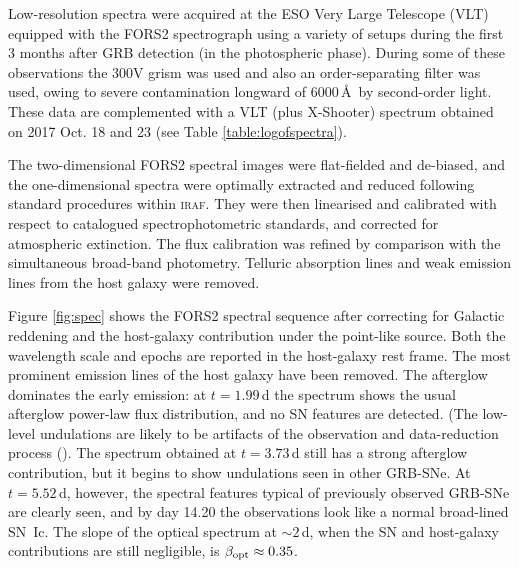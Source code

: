 \documentclass[fleqn,usenatbib]{mnras}
\begin{document}
Low-resolution spectra were acquired at the ESO Very Large Telescope (VLT) equipped with the FORS2 spectrograph using a variety of setups during the first 3 months after GRB detection (in the photospheric phase). During some of these observations the 300V grism was used and  also an order-separating filter was used, owing to severe contamination longward of 6000\,\AA\  by second-order light. These data are complemented with a VLT (plus X-Shooter) spectrum obtained on 2017 Oct. 18 and 23 (see Table \ref{table:logofspectra}). 


The two-dimensional FORS2 spectral images  were flat-fielded and de-biased, and the one-dimensional spectra were optimally extracted \citep{Horne86} and reduced following standard procedures within  \textsc{iraf}. They were then linearised  and calibrated with respect to catalogued spectrophotometric standards, and corrected for atmospheric extinction. The flux calibration was refined by comparison with the  simultaneous broad-band photometry.  Telluric absorption lines and weak emission lines from the host galaxy were removed.  



Figure \ref{fig:spec} shows the FORS2 spectral sequence after correcting for  Galactic reddening and the host-galaxy contribution under the point-like source.   Both the wavelength scale and epochs are reported in the host-galaxy rest frame. The  most prominent emission lines of the host galaxy have been removed. The afterglow dominates the early emission: at $t=1.99$\,d the spectrum shows the usual afterglow power-law flux distribution, and no SN features are detected. (The low-level undulations are likely to be artifacts of the observation and data-reduction process (\citealt{Filippenko82}). The spectrum obtained at $t=3.73$\,d  still has a strong afterglow contribution, but it begins to show undulations seen in other GRB-SNe.  At $t=5.52$\,d, however, the spectral features typical of previously observed GRB-SNe are clearly seen, and by day 14.20 the observations look like a normal broad-lined SN~Ic.   The slope of the optical spectrum at $\sim2$\,d, when the SN and host-galaxy contributions are still negligible, is $\beta_{\rm opt} \approx 0.35$.
\end{document}

